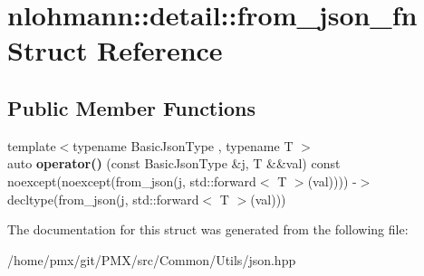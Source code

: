 \hypertarget{structnlohmann_1_1detail_1_1from__json__fn}{}\section{nlohmann\+:\+:detail\+:\+:from\+\_\+json\+\_\+fn Struct Reference}
\label{structnlohmann_1_1detail_1_1from__json__fn}
\subsection*{Public Member Functions}
\begin{DoxyCompactItemize}
\item 
\mbox{\label{structnlohmann_1_1detail_1_1from__json__fn_a4ab8572670a673d64b783589cf658270}} 
{\footnotesize template$<$typename Basic\+Json\+Type , typename T $>$ }\\auto {\bfseries operator()} (const Basic\+Json\+Type \&j, T \&\&val) const noexcept(noexcept(from\+\_\+json(j, std\+::forward$<$ T $>$(val)))) -\/$>$ decltype(from\+\_\+json(j, std\+::forward$<$ T $>$(val)))
\end{DoxyCompactItemize}


The documentation for this struct was generated from the following file\+:\begin{DoxyCompactItemize}
\item 
/home/pmx/git/\+P\+M\+X/src/\+Common/\+Utils/json.\+hpp\end{DoxyCompactItemize}
